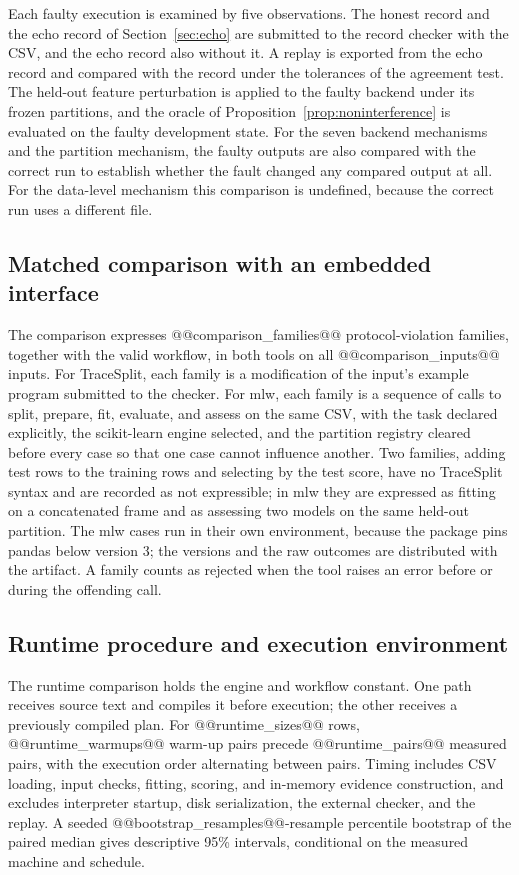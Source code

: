 \documentclass[lettersize,journal]{IEEEtran}
\newcommand{\tool}{TraceSplit}
\begin{document}
Each faulty execution is examined by five observations. The honest record and the echo record of Section~\ref{sec:echo} are submitted to the record checker with the CSV, and the echo record also without it. A replay is exported from the echo record and compared with the record under the tolerances of the agreement test. The held-out feature perturbation is applied to the faulty backend under its frozen partitions, and the oracle of Proposition~\ref{prop:noninterference} is evaluated on the faulty development state. For the seven backend mechanisms and the partition mechanism, the faulty outputs are also compared with the correct run to establish whether the fault changed any compared output at all. For the data-level mechanism this comparison is undefined, because the correct run uses a different file.

\subsection{Matched comparison with an embedded interface}\label{sec:comparisonmethod}
The comparison expresses @@comparison_families@@ protocol-violation families, together with the valid workflow, in both tools on all @@comparison_inputs@@ inputs. For \tool{}, each family is a modification of the input's example program submitted to the checker. For mlw, each family is a sequence of calls to split, prepare, fit, evaluate, and assess on the same CSV, with the task declared explicitly, the scikit-learn engine selected, and the partition registry cleared before every case so that one case cannot influence another. Two families, adding test rows to the training rows and selecting by the test score, have no \tool{} syntax and are recorded as not expressible; in mlw they are expressed as fitting on a concatenated frame and as assessing two models on the same held-out partition. The mlw cases run in their own environment, because the package pins pandas below version 3; the versions and the raw outcomes are distributed with the artifact. A family counts as rejected when the tool raises an error before or during the offending call.

\subsection{Runtime procedure and execution environment}
The runtime comparison holds the engine and workflow constant. One path receives source text and compiles it before execution; the other receives a previously compiled plan. For @@runtime_sizes@@ rows, @@runtime_warmups@@ warm-up pairs precede @@runtime_pairs@@ measured pairs, with the execution order alternating between pairs. Timing includes CSV loading, input checks, fitting, scoring, and in-memory evidence construction, and excludes interpreter startup, disk serialization, the external checker, and the replay. A seeded @@bootstrap_resamples@@-resample percentile bootstrap of the paired median gives descriptive 95\% intervals, conditional on the measured machine and schedule.
\end{document}
